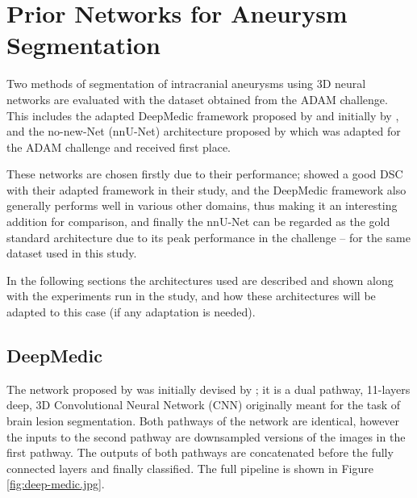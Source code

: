 \section{Prior Networks for Aneurysm Segmentation}
\label{chapter4}

Two methods of segmentation of intracranial aneurysms using 3D neural networks are evaluated with the dataset obtained from the ADAM challenge. This includes the adapted DeepMedic framework proposed by \citeauthor{Sichermann2019} and initially by \citeauthor{Kamnitsas2017}, and the no-new-Net (nnU-Net) architecture proposed by \citeauthor{nnUnet} which was adapted for the ADAM challenge and received first place. 

These networks are chosen firstly due to their performance; \citeauthor{Sichermann2019} showed a good DSC with their adapted framework in their study, and the DeepMedic framework also generally performs well in various other domains, thus making it an interesting addition for comparison, and finally the nnU-Net can be regarded as the gold standard architecture due to its peak performance in the challenge -- for the same dataset used in this study.

In the following sections the architectures used are described and shown along with the experiments run in the study, and how these architectures will be adapted to this case (if any adaptation is needed). 

%
%


\subsection{DeepMedic}
The network proposed by \citeauthor{Sichermann2019} was initially devised by \citeauthor{Kamnitsas2017}; it is a dual pathway, 11-layers deep, 3D Convolutional Neural Network (CNN) originally meant for the task of brain lesion segmentation. Both pathways of the network are identical, however the inputs to the second pathway are downsampled versions of the images in the first pathway. The outputs of both pathways are concatenated before the fully connected layers and finally classified. The full pipeline is shown in Figure \ref{fig:deep-medic.jpg}.


